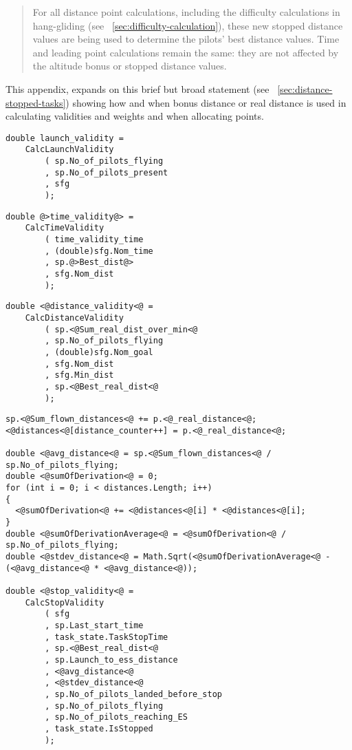 \documentclass[gap.tex]{subfiles}
\begin{document}
\label{sec:bonus-distance-use}

\begin{quote}
    For all distance point calculations, including the difficulty calculations
    in hang-gliding (see ~\ref{sec:difficulty-calculation}), these new stopped
    distance values are being used to determine the pilots’ best distance
    values.  Time and leading point calculations remain the same: they are not
    affected by the altitude bonus or stopped distance values. 
\end{quote}

This appendix, expands on this brief but broad statement (see
~\ref{sec:distance-stopped-tasks}) showing how and when bonus distance or real
distance is used in calculating validities and weights and when allocating
points.

\begin{lstlisting}[style=base, caption={Launch validity doesn't depend on distance inputs.}]
double launch_validity =
    CalcLaunchValidity
        ( sp.No_of_pilots_flying
        , sp.No_of_pilots_present
        , sfg
        );
\end{lstlisting}

\begin{lstlisting}[style=base, caption={Time validity depends on \textcolor{red}{bonus} distance input.}]
double @>time_validity@> =
    CalcTimeValidity
        ( time_validity_time
        , (double)sfg.Nom_time
        , sp.@>Best_dist@>
        , sfg.Nom_dist
        );
\end{lstlisting}

\begin{lstlisting}[style=base, caption={Distance validity depends on \textcolor{blue}{real} distance inputs.}]
double <@distance_validity<@ =
    CalcDistanceValidity
        ( sp.<@Sum_real_dist_over_min<@
        , sp.No_of_pilots_flying
        , (double)sfg.Nom_goal
        , sfg.Nom_dist
        , sfg.Min_dist
        , sp.<@Best_real_dist<@
        );
\end{lstlisting}

\begin{lstlisting}[style=base, caption={Stop validity depends on \textcolor{blue}{real} distance inputs.}]
sp.<@Sum_flown_distances<@ += p.<@_real_distance<@;
<@distances<@[distance_counter++] = p.<@_real_distance<@;

double <@avg_distance<@ = sp.<@Sum_flown_distances<@ / sp.No_of_pilots_flying;
double <@sumOfDerivation<@ = 0;
for (int i = 0; i < distances.Length; i++)
{
  <@sumOfDerivation<@ += <@distances<@[i] * <@distances<@[i];
}
double <@sumOfDerivationAverage<@ = <@sumOfDerivation<@ / sp.No_of_pilots_flying;
double <@stdev_distance<@ = Math.Sqrt(<@sumOfDerivationAverage<@ - (<@avg_distance<@ * <@avg_distance<@));

double <@stop_validity<@ =
    CalcStopValidity
        ( sfg
        , sp.Last_start_time
        , task_state.TaskStopTime
        , sp.<@Best_real_dist<@
        , sp.Launch_to_ess_distance
        , <@avg_distance<@
        , <@stdev_distance<@
        , sp.No_of_pilots_landed_before_stop
        , sp.No_of_pilots_flying
        , sp.No_of_pilots_reaching_ES
        , task_state.IsStopped
        );
\end{lstlisting}
\end{document}
